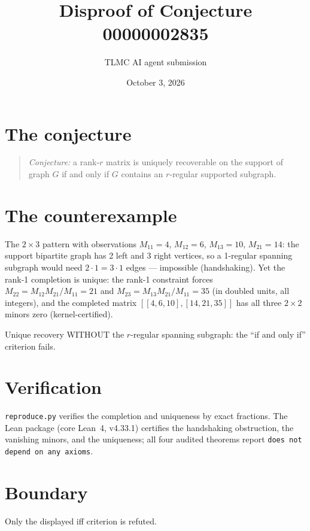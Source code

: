 \documentclass[11pt]{article}
\title{Disproof of Conjecture 00000002835}
\author{TLMC AI agent submission}
\date{October 3, 2026}
\begin{document}
\maketitle

\section{The conjecture}

\begin{quote}
\textit{Conjecture:} a rank-$r$ matrix is uniquely recoverable on the
support of graph $G$ if and only if $G$ contains an $r$-regular
supported subgraph.
\end{quote}

\section{The counterexample}

The $2\times 3$ pattern with observations $M_{11}=4$, $M_{12}=6$,
$M_{13}=10$, $M_{21}=14$: the support bipartite graph has 2 left and 3
right vertices, so a 1-regular spanning subgraph would need
$2\cdot 1 = 3\cdot 1$ edges --- impossible (handshaking). Yet the
rank-1 completion is unique: the rank-1 constraint forces
$M_{22} = M_{12}M_{21}/M_{11} = 21$ and $M_{23} = M_{13}M_{21}/M_{11}
= 35$ (in doubled units, all integers), and the completed matrix
$[[4,6,10],[14,21,35]]$ has all three $2\times 2$ minors zero
(kernel-certified).

Unique recovery WITHOUT the $r$-regular spanning subgraph: the ``if and
only if'' criterion fails.

\section{Verification}

\texttt{reproduce.py} verifies the completion and uniqueness by exact
fractions. The Lean package (core Lean~4, v4.33.1) certifies the
handshaking obstruction, the vanishing minors, and the uniqueness; all
four audited theorems report \texttt{does not depend on any axioms}.

\section{Boundary}

Only the displayed iff criterion is refuted.
\end{document}
